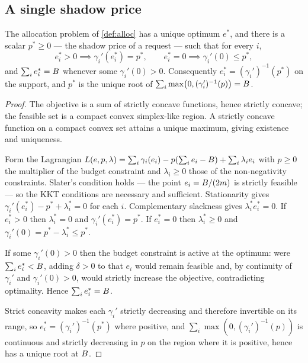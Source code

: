 \subsection{A single shadow price}

\begin{theorem}
\label{thm:allocation}
The allocation problem of \cref{def:alloc} has a unique optimum $e^\ast$, and
there is a scalar $p^\ast \geq 0$ --- the shadow price of a request --- such
that for every $i$,
\[
e_i^\ast > 0 \implies \gamma_i'(e_i^\ast) = p^\ast,
\qquad
e_i^\ast = 0 \implies \gamma_i'(0) \leq p^\ast ,
\]
and $\sum_i e_i^\ast = B$ whenever some $\gamma_i'(0) > 0$. Consequently
$e_i^\ast = (\gamma_i')^{-1}(p^\ast)$ on the support, and $p^\ast$ is the unique
root of $\sum_i \max\bigl(0, (\gamma_i')^{-1}(p)\bigr) = B$.
\end{theorem}

\begin{proof}
The objective is a sum of strictly concave functions, hence strictly concave;
the feasible set is a compact convex simplex-like region. A strictly concave
function on a compact convex set attains a unique maximum, giving existence and
uniqueness.

Form the Lagrangian
$L(e,p,\lambda) = \sum_i \gamma_i(e_i) - p(\sum_i e_i - B) + \sum_i \lambda_i e_i$
with $p \geq 0$ the multiplier of the budget constraint and $\lambda_i \geq 0$
those of the non-negativity constraints. Slater's condition holds --- the point
$e_i = B/(2m)$ is strictly feasible --- so the KKT conditions are necessary
and sufficient. Stationarity gives
$\gamma_i'(e_i^\ast) - p^\ast + \lambda_i^\ast = 0$ for each $i$. Complementary
slackness gives $\lambda_i^\ast e_i^\ast = 0$. If $e_i^\ast > 0$ then
$\lambda_i^\ast = 0$ and $\gamma_i'(e_i^\ast) = p^\ast$. If $e_i^\ast = 0$ then
$\lambda_i^\ast \geq 0$ and $\gamma_i'(0) = p^\ast - \lambda_i^\ast \leq p^\ast$.

If some $\gamma_i'(0) > 0$ then the budget constraint is active at the optimum:
were $\sum_i e_i^\ast < B$, adding $\delta > 0$ to that $e_i$ would remain
feasible and, by continuity of $\gamma_i'$ and $\gamma_i'(0)>0$, would strictly
increase the objective, contradicting optimality. Hence $\sum_i e_i^\ast = B$.

Strict concavity makes each $\gamma_i'$ strictly decreasing and therefore
invertible on its range, so $e_i^\ast = (\gamma_i')^{-1}(p^\ast)$ where
positive, and $\sum_i \max(0,(\gamma_i')^{-1}(p))$ is continuous and strictly
decreasing in $p$ on the region where it is positive, hence has a unique root
at $B$.
\end{proof}

